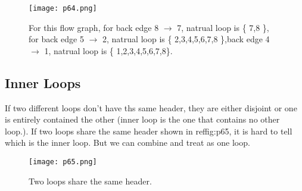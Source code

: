 \begin{figure}[H]
    \centering
     \texttt{[image: p64.png]}
         \caption{For this flow graph, for back edge 8 $\rightarrow$ 7, natrual loop is \{ 7,8 \}, for back edge 5 $\rightarrow$ 2, natrual loop is \{ 2,3,4,5,6,7,8 \},back edge 4 $\rightarrow$ 1, natrual loop is \{ 1,2,3,4,5,6,7,8\}.}
         \label{fig:p64}
\end{figure}

\subsection{Inner Loops}

If two different loops don't have ths same header, they are either disjoint or one is entirely contained the other (inner loop is the one that contains no other loop.).
If two loops share the same header shown in ref{fig:p65}, it is hard to tell which is the inner loop. But we can combine and treat as one loop.


\begin{figure}[H]
    \centering
     \texttt{[image: p65.png]}
         \caption{Two loops share the same header.}
         \label{fig:p65}
\end{figure}















